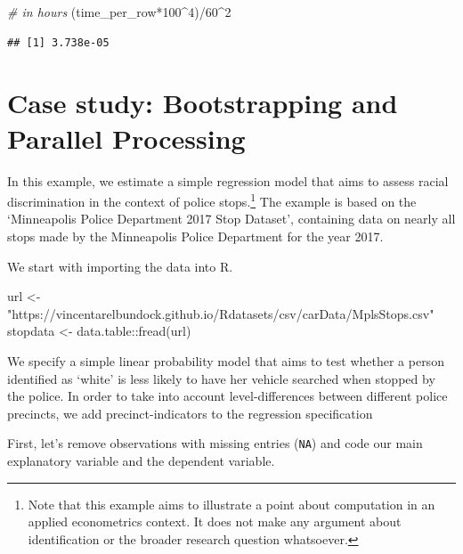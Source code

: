 \documentclass[
  12pt,
]{style/krantz}
\newenvironment{Shaded}{\begin{snugshade}}{\end{snugshade}}
\newcommand{\CommentTok}[1]{\textcolor[rgb]{0.56,0.35,0.01}{\textit{#1}}}
\newcommand{\DecValTok}[1]{\textcolor[rgb]{0.00,0.00,0.81}{#1}}
\newcommand{\FunctionTok}[1]{\textcolor[rgb]{0.00,0.00,0.00}{#1}}
\newcommand{\NormalTok}[1]{#1}
\newcommand{\OtherTok}[1]{\textcolor[rgb]{0.56,0.35,0.01}{#1}}
\newcommand{\SpecialCharTok}[1]{\textcolor[rgb]{0.00,0.00,0.00}{#1}}
\newcommand{\StringTok}[1]{\textcolor[rgb]{0.31,0.60,0.02}{#1}}
\begin{document}
\begin{Shaded}
\begin{Highlighting}[]
\CommentTok{\# in hours}
\NormalTok{(time\_per\_row}\SpecialCharTok{*}\DecValTok{100}\SpecialCharTok{\^{}}\DecValTok{4}\NormalTok{)}\SpecialCharTok{/}\DecValTok{60}\SpecialCharTok{\^{}}\DecValTok{2} 
\end{Highlighting}
\end{Shaded}

\begin{verbatim}
## [1] 3.738e-05
\end{verbatim}

\hypertarget{case-study-bootstrapping-and-parallel-processing}{%
\section{Case study: Bootstrapping and Parallel Processing}\label{case-study-bootstrapping-and-parallel-processing}}

In this example, we estimate a simple regression model that aims to assess racial discrimination in the context of police stops.\footnote{Note that this example aims to illustrate a point about computation in an applied econometrics context. It does not make any argument about identification or the broader research question whatsoever.} The example is based on the `Minneapolis Police Department 2017 Stop Dataset', containing data on nearly all stops made by the Minneapolis Police Department for the year 2017.

We start with importing the data into R.

\begin{Shaded}
\begin{Highlighting}[]
\NormalTok{url }\OtherTok{\textless{}{-}} \StringTok{"https://vincentarelbundock.github.io/Rdatasets/csv/carData/MplsStops.csv"}
\NormalTok{stopdata }\OtherTok{\textless{}{-}}\NormalTok{ data.table}\SpecialCharTok{::}\FunctionTok{fread}\NormalTok{(url) }
\end{Highlighting}
\end{Shaded}

We specify a simple linear probability model that aims to test whether a person identified as `white' is less likely to have her vehicle searched when stopped by the police. In order to take into account level-differences between different police precincts, we add precinct-indicators to the regression specification

First, let's remove observations with missing entries (\texttt{NA}) and code our main explanatory variable and the dependent variable.
\end{document}
